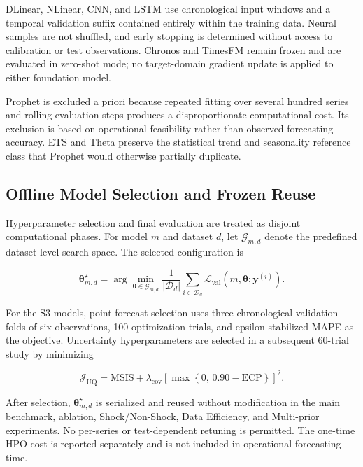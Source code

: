\documentclass[review,number,sort&compress]{elsarticle}
\begin{document}
DLinear, NLinear, CNN, and LSTM use chronological input windows and a temporal validation suffix contained entirely within the training data. Neural samples are not shuffled, and early stopping is determined without access to calibration or test observations. Chronos and TimesFM remain frozen and are evaluated in zero-shot mode; no target-domain gradient update is applied to either foundation model.

Prophet is excluded a priori because repeated fitting over several hundred series and rolling evaluation steps produces a disproportionate computational cost. Its exclusion is based on operational feasibility rather than observed forecasting accuracy. ETS and Theta preserve the statistical trend and seasonality reference class that Prophet would otherwise partially duplicate.

\subsection{Offline Model Selection and Frozen Reuse}
\label{subsec:hpo}

Hyperparameter selection and final evaluation are treated as disjoint computational phases. For model \(m\) and dataset \(d\), let \(\mathcal{G}_{m,d}\) denote the predefined dataset-level search space. The selected configuration is

\begin{equation}
\boldsymbol{\theta}^{\star}_{m,d}
=
\arg\min_{\boldsymbol{\theta}\in\mathcal{G}_{m,d}}
\frac{1}{|\mathcal{D}_d|}
\sum_{i\in\mathcal{D}_d}
\mathcal{L}_{\mathrm{val}}
\left(
m,\boldsymbol{\theta};\mathbf{y}^{(i)}
\right).
\label{eq:frozen_hpo}
\end{equation}

For the S3 models, point-forecast selection uses three chronological validation folds of six observations, 100 optimization trials, and epsilon-stabilized MAPE as the objective. Uncertainty hyperparameters are selected in a subsequent 60-trial study by minimizing

\begin{equation}
\mathcal{J}_{\mathrm{UQ}}
=
\mathrm{MSIS}
+
\lambda_{\mathrm{cov}}
\left[
\max\left\{
0,\,
0.90-\mathrm{ECP}
\right\}
\right]^2.
\label{eq:uq_hpo}
\end{equation}

After selection, \(\boldsymbol{\theta}^{\star}_{m,d}\) is serialized and reused without modification in the main benchmark, ablation, Shock/Non-Shock, Data Efficiency, and Multi-prior experiments. No per-series or test-dependent retuning is permitted. The one-time HPO cost is reported separately and is not included in operational forecasting time.
\end{document}
